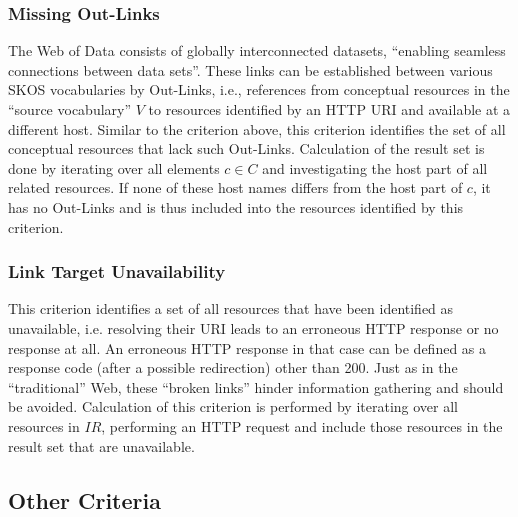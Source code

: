 \subsubsection{Missing Out-Links}
The Web of Data consists of globally interconnected datasets, ``enabling seamless connections between data sets''\cite{Heath2011}. These links can be established between various SKOS vocabularies by Out-Links, i.e., references from conceptual resources in the ``source vocabulary'' $V$ to resources identified by an HTTP URI and available at a different host. Similar to the criterion above, this criterion identifies the set of all conceptual resources that lack such Out-Links. Calculation of the result set is done by iterating over all elements $c \in C$ and investigating the host part of all related resources. If none of these host names differs from the host part of $c$, it has no Out-Links and is thus included into the resources identified by this criterion.


\subsubsection{Link Target Unavailability}
This criterion identifies a set of all resources that have been identified as unavailable, i.e. resolving their URI leads to an erroneous HTTP response or no response at all. An erroneous HTTP response in that case can be defined as a response code (after a possible redirection) other than 200. Just as in the ``traditional'' Web, these ``broken links'' hinder information gathering and should be avoided. Calculation of this criterion is performed by iterating over all resources in $IR$, performing an HTTP request and include those resources in the result set that are unavailable.


\subsection{Other Criteria}

